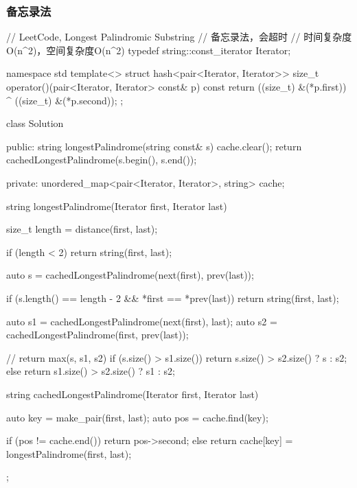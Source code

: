 \subsubsection{备忘录法}
\begin{Code}
// LeetCode, Longest Palindromic Substring
// 备忘录法，会超时
// 时间复杂度O(n^2)，空间复杂度O(n^2)
typedef string::const_iterator Iterator;

namespace std {
template<>
struct hash<pair<Iterator, Iterator>> {
    size_t operator()(pair<Iterator, Iterator> const& p) const {
        return ((size_t) &(*p.first)) ^ ((size_t) &(*p.second));
    }
};
}

class Solution {
public:
    string longestPalindrome(string const& s) {
        cache.clear();
        return cachedLongestPalindrome(s.begin(), s.end());
    }

private:
    unordered_map<pair<Iterator, Iterator>, string> cache;

    string longestPalindrome(Iterator first, Iterator last) {
        size_t length = distance(first, last);

        if (length < 2) return string(first, last);

        auto s = cachedLongestPalindrome(next(first), prev(last));

        if (s.length() == length - 2 && *first == *prev(last))
            return string(first, last);

        auto s1 = cachedLongestPalindrome(next(first), last);
        auto s2 = cachedLongestPalindrome(first, prev(last));

        // return max(s, s1, s2)
        if (s.size() > s1.size()) return s.size() > s2.size() ? s : s2;
        else return s1.size() > s2.size() ? s1 : s2;
    }

    string cachedLongestPalindrome(Iterator first, Iterator last) {
        auto key = make_pair(first, last);
        auto pos = cache.find(key);

        if (pos != cache.end()) return pos->second;
        else return cache[key] = longestPalindrome(first, last);
    }
};
\end{Code}


